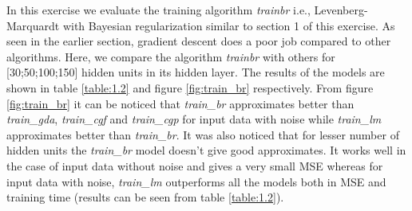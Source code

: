 In this exercise we evaluate the training algorithm \textit{trainbr} i.e., Levenberg-Marquardt with Bayesian regularization similar to section 1 of this exercise. As seen in the earlier section, gradient descent does a poor job compared to other algorithms. Here, we compare the algorithm \textit{trainbr} with others for [30;50;100;150] hidden units in its hidden layer. The results of the models are shown in table \ref{table:1.2} and figure \ref{fig:train_br} respectively. From figure \ref{fig:train_br} it can be noticed that \textit{train\_br} approximates better than \textit{train\_gda}, \textit{train\_cgf} and \textit{train\_cgp} for input data with noise while \textit{train\_lm} approximates better than \textit{train\_br}. It was also noticed that for lesser number of hidden units the \textit{train\_br} model doesn't give good approximates. It works well in the case of input data without noise and gives a very small MSE whereas  for input data with noise, \textit{train\_lm} outperforms all the models both in MSE and training time (results can be seen from table \ref{table:1.2}).
